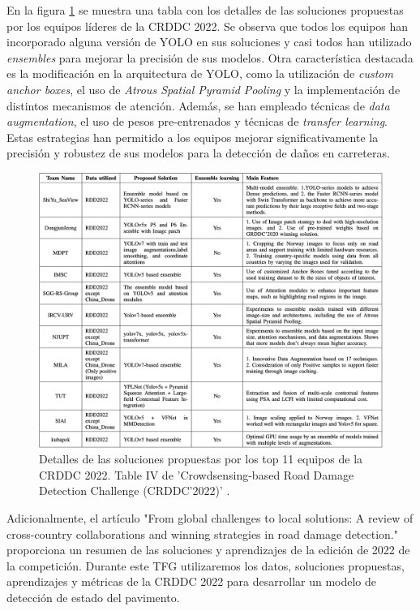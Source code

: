 En la figura \ref{fig:CRDDC2022_detailed_solutions} se muestra una tabla con los detalles de las soluciones propuestas por los equipos líderes de la CRDDC 2022. Se observa que todos los equipos han incorporado alguna versión de YOLO en sus soluciones y casi todos han utilizado \textit{ensembles} para mejorar la precisión de sus modelos. Otra característica destacada es la modificación en la arquitectura de YOLO, como la utilización de \textit{custom anchor boxes}, el uso de \textit{Atrous Spatial Pyramid Pooling} y la implementación de distintos mecanismos de atención. Además, se han empleado técnicas de \textit{data augmentation}, el uso de pesos pre-entrenados y técnicas de \textit{transfer learning}. Estas estrategias han permitido a los equipos mejorar significativamente la precisión y robustez de sus modelos para la detección de daños en carreteras.

\begin{figure}[H]
    \centering
    \includegraphics[width=1\textwidth]{../img/winner-solutions.png}
    \caption{Detalles de las soluciones propuestas por los top 11 equipos de la CRDDC 2022. Table IV de 'Crowdsensing-based Road Damage Detection Challenge (CRDDC’2022)' \cite{CRDDC2022_paper}.}
    \label{fig:CRDDC2022_detailed_solutions}
\end{figure}

Adicionalmente, el artículo "From global challenges to local solutions: A review of cross-country collaborations and winning strategies in road damage detection." \cite{CRDDC2022_review} proporciona un resumen de las soluciones y aprendizajes de la edición de 2022 de la competición. Durante este TFG utilizaremos los datos, soluciones propuestas, aprendizajes y métricas de la CRDDC 2022 para desarrollar un modelo de detección de estado del pavimento.

